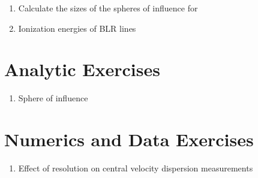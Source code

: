 \begin{enumerate} 
\item Calculate the sizes of the spheres of influence for 
\item Ionization energies of BLR lines
\end{enumerate} 

\section{Analytic Exercises}

\begin{enumerate}
\item Sphere of influence
\end{enumerate}

\section{Numerics and Data Exercises}

\begin{enumerate}
\item Effect of resolution on central velocity dispersion measurements
\end{enumerate}


  
